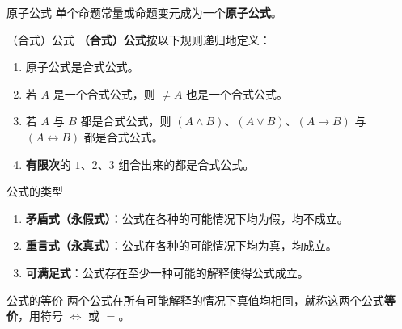 
\begin{definition}{原子公式}
单个命题常量或命题变元成为一个\textbf{原子公式}。
\end{definition}
\begin{definition}{（合式）公式}
\textbf{（合式）公式}按以下规则递归地定义：
\begin{enumerate}
\item 原子公式是合式公式。
\item 若 $A$ 是一个合式公式，则 $\neq A$ 也是一个合式公式。
\item 若 $A$ 与 $B$ 都是合式公式，则 $(A \land B)$、$(A \lor B)$、$(A \to B)$ 与 $(A \leftrightarrow B)$ 都是合式公式。
\item \textbf{有限次}的 $1$、$2$、$3$ 组合出来的都是合式公式。
\end{enumerate}

\end{definition}
\begin{definition}{公式的类型}
\begin{enumerate}
\item \textbf{矛盾式（永假式）}：公式在各种的可能情况下均为假，均不成立。
\item \textbf{重言式（永真式）}：公式在各种的可能情况下均为真，均成立。
\item \textbf{可满足式}：公式存在至少一种可能的解释使得公式成立。
\end{enumerate}
\end{definition}

\begin{definition}{公式的等价}
两个公式在所有可能解释的情况下真值均相同，就称这两个公式\textbf{等价}，用符号 $\Leftrightarrow$ 或 $=$。
\end{definition}